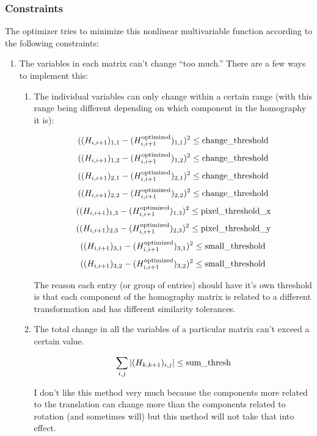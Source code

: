 \documentclass{article}
\begin{document}
\subsubsection{Constraints}

The optimizer tries to minimize this nonlinear multivariable function according
to the following constraints:

\begin{enumerate}

\item The variables in each matrix can't change ``too much.'' There are a few
ways to implement this:

\begin{enumerate}

\item \label{indiv_thresh} The individual variables can only change within a certain range (with
this range being different depending on which component in the homography it
is):

\[((H_{i, i+1})_{1, 1} - (H_{i, i+1}^{\textnormal{optimized}})_{1, 1})^2 \leq \textnormal{change\_threshold}\] 
\[((H_{i, i+1})_{1, 2} - (H_{i, i+1}^{\textnormal{optimized}})_{1, 2})^2 \leq \textnormal{change\_threshold}\] 
\[((H_{i, i+1})_{2, 1} - (H_{i, i+1}^{\textnormal{optimized}})_{2, 1})^2 \leq \textnormal{change\_threshold}\] 
\[((H_{i, i+1})_{2, 2} - (H_{i, i+1}^{\textnormal{optimized}})_{2, 2})^2 \leq \textnormal{change\_threshold}\] 
\[((H_{i, i+1})_{1, 3} - (H_{i, i+1}^{\textnormal{optimized}})_{1, 3})^2 \leq \textnormal{pixel\_threshold\_x}\] 
\[((H_{i, i+1})_{2, 3} - (H_{i, i+1}^{\textnormal{optimized}})_{2, 3})^2 \leq \textnormal{pixel\_threshold\_y}\] 
\[((H_{i, i+1})_{3, 1} - (H_{i, i+1}^{\textnormal{optimized}})_{3, 1})^2 \leq \textnormal{small\_threshold}\] 
\[((H_{i, i+1})_{3, 2} - (H_{i, i+1}^{\textnormal{optimized}})_{3, 2})^2 \leq \textnormal{small\_threshold}\] 

The reason each entry (or group of entries) should have it's own threshold is
that each component of the homography matrix is related to a different
transformation and has different similarity tolerances. 

\item The total change in all the variables of a particular matrix can't exceed a certain value.

\[\sum_{i, j} |(H_{k, k+1})_{i, j}| \leq \textnormal{sum\_thresh}\]

I don't like this method very much because the components more related to the
translation can change more than the components related to rotation (and
sometimes will) but this method will not take that into effect. 


\end{enumerate}
\end{enumerate}
\end{document}
